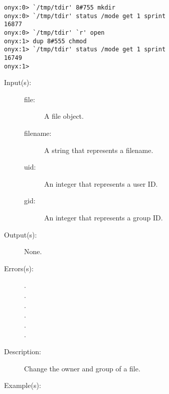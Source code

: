 \begin{description}
\begin{description}
\begin{verbatim}
onyx:0> `/tmp/tdir' 8#755 mkdir 
onyx:0> `/tmp/tdir' status /mode get 1 sprint
16877
onyx:0> `/tmp/tdir' `r' open 
onyx:1> dup 8#555 chmod
onyx:1> `/tmp/tdir' status /mode get 1 sprint
16749
onyx:1>
		\end{verbatim}
	\end{description}
\label{systemdict:chown}
\item[{\onyxop{file/filename uid gid}{chown}{--}}: ]
	\begin{description}\item[]
	\item[Input(s): ]
		\begin{description}\item[]
		\item[file: ]
			A file object.
		\item[filename: ]
			A string that represents a filename.
		\item[uid: ]
			An integer that represents a user ID.
		\item[gid: ]
			An integer that represents a group ID.
		\end{description}
	\item[Output(s): ] None.
	\item[Errors(s): ]
		\begin{description}\item[]
		\item[.]
		\item[.]
		\item[.]
		\item[.]
		\item[.]
		\item[.]
		\end{description}
	\item[Description: ]
		Change the owner and group of a file.
	\item[Example(s): ]\begin{verbatim}


\end{verbatim}
\end{description}
\end{description}
